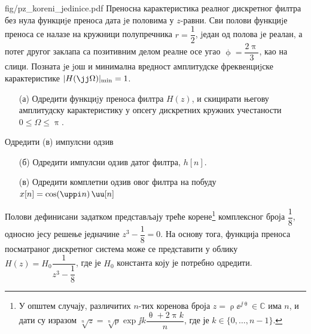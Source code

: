 \begin{slikaDesno}{fig/pz_koreni_jedinice.pdf}
    \PID 
    Преносна карактеристика реалног дискретног филтра без нула функциjе преноса
    дата jе половима у $z$-равни. Сви полови функциjе преноса се налазе на кружници
    полупречника $r = \dfrac12$, jедан од полова jе реалан, а потег другог заклапа са позитивним
    делом реалне осе угао $\upphi = \dfrac{2\uppi}{3}$, као на слици. Позната jе jош и минимална вредност
    амплитудске фреквенциjске карактеристике $|H(\jj\Omega)|_{\rm min} = 1$. 
    \begin{enumerate}
        \item[(а)]  Одредити функциjу
                    преноса филтра $H(z)$, и скицирати његову амплитудску карактеристику у 
                    опсегу дискретних кружних учестаности $0 \leq \Omega \leq \uppi$.
    \end{enumerate}
    Одредити (в) импулсни одзив
\end{slikaDesno}
\begin{enumerate}
    \item[(б)] Одредити импулсни одзив датог филтра, $h[n]$. 
    \item[(в)] Одредити комплетни одзив овог филтра на побуду $x[n] = \cos(\uppi n)\, \uu[n]$
\end{enumerate}

\RESENJE
Полови дефинисани задатком представљају треће корене\footnote{У општем случају, различитих $n$-тих коренова  
броја $z = \uprho \ee^{\jj\uptheta} \in \mathbb C$ има $n$, и дати су изразом 
$\sqrt[n]{z} = \sqrt[n]{\uprho} \exp{\jj k \dfrac{\uptheta + 2\uppi k}{n}}$, где је $k \in \{0,\ldots,n-1\}$.} 
комплексног броја $\dfrac{1}{8}$, односно јесу решење једначине 
$z^3 - \dfrac{1}{8} = 0$. На основу тога, функција преноса посматраног дискретног система може се представити у облику 
$H(z) = H_0 \dfrac{1}{z^3 - \dfrac{1}{8}}$, где је $H_0$ константа коју је потребно одредити.  

